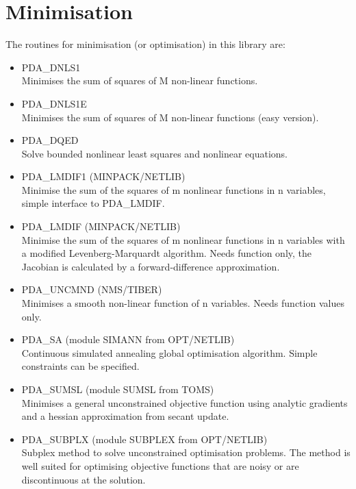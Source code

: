 \documentclass[11pt,twoside]{article}
\newcommand{\htmlref}[2]{#1}
\newcommand{\xlabel}[1]{}
\begin{document}
\section{\xlabel{minimisation}Minimisation}

   The routines for minimisation (or optimisation) in this library are:

\begin{itemize}

\item \htmlref{PDA\_DNLS1}{PDA\_DNLS1} \\
   Minimises the sum of squares of M non-linear functions.

\item \htmlref{PDA\_DNLS1E}{PDA\_DNLS1E} \\
   Minimises the sum of squares of M non-linear functions (easy version).

\item \htmlref{PDA\_DQED}{PDA\_DQED} \\
   Solve bounded nonlinear least squares and nonlinear equations.

\item \htmlref{PDA\_LMDIF1}{PDA\_LMDIF1} (MINPACK/NETLIB)\ \\
   Minimise the sum of the squares of m nonlinear functions in n
   variables, simple interface to PDA\_LMDIF.

\item \htmlref{PDA\_LMDIF}{PDA\_LMDIF} (MINPACK/NETLIB)\ \\
   Minimise the sum of the squares of m nonlinear functions in n
   variables with a modified Levenberg-Marquardt algorithm. Needs
   function only, the Jacobian is calculated by a forward-difference
   approximation.

\item \htmlref{PDA\_UNCMND}{PDA\_UNCMND} (NMS/TIBER)\ \\
   Minimises a smooth non-linear function of n variables. Needs
   function values only.

\item \htmlref{PDA\_SA}{PDA\_SA} (module SIMANN from OPT/NETLIB)\ \\
   Continuous simulated annealing global optimisation algorithm.
   Simple constraints can be specified.

\item \htmlref{PDA\_SUMSL}{PDA\_SUMSL} (module SUMSL from TOMS)\ \\
   Minimises a general unconstrained objective function using  
   analytic gradients and a hessian approximation from secant update.

\item \htmlref{PDA\_SUBPLX}{PDA\_SUBPLX} (module SUBPLEX from OPT/NETLIB)\ \\
   Subplex method to solve unconstrained optimisation problems.  The
   method is well suited for optimising objective functions that are
   noisy or are discontinuous at the solution.

\end{itemize}
\end{document}
